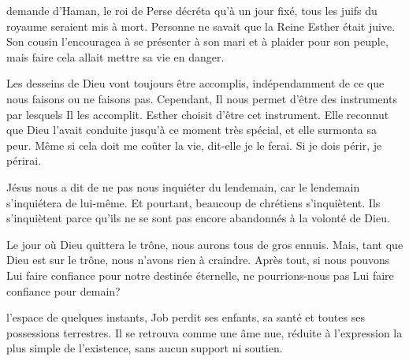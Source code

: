  demande d'Haman, le roi de Perse décréta qu'à un jour fixé,
 tous les juifs du royaume seraient mis à mort.
 Personne ne savait que la Reine Esther était juive.
 Son cousin l'encouragea à se présenter à son mari et à plaider pour son peuple,
 mais faire cela allait mettre sa vie en danger.

Les desseins de Dieu vont toujours être accomplis,
 indépendamment de ce que nous faisons ou ne faisons pas.
 Cependant, Il nous permet d'être des instruments par lesquels Il les accomplit.
 Esther choisit d'être cet instrument.
 Elle reconnut que Dieu l'avait conduite jusqu'à ce moment très spécial,
 et elle surmonta sa peur.
 \og Même si cela doit me coûter la vie, \fg{} dit-elle \og je le ferai.
 Si je dois périr, je périrai. \fg{}

Jésus nous a dit de ne pas nous inquiéter du lendemain,
 car le lendemain s'inquiétera de lui-même.
 Et pourtant, beaucoup de chrétiens s'inquiètent.
 Ils s'inquiètent parce qu'ils ne se sont pas encore
 abandonnés à la volonté de Dieu.


Le jour où Dieu quittera le trône, nous aurons tous de gros ennuis.
 Mais, tant que Dieu est sur le trône, nous n'avons rien à craindre.
 Après tout, si nous pouvons Lui faire confiance pour notre destinée éternelle,
 ne pourrions-nous pas Lui faire confiance pour demain?

\dvrule







 l'espace de quelques instants,
 Job perdit ses enfants, sa santé et toutes ses possessions terrestres.
 Il se retrouva comme une âme nue, réduite à l'expression la plus simple
 de l'existence, sans aucun support ni soutien.


